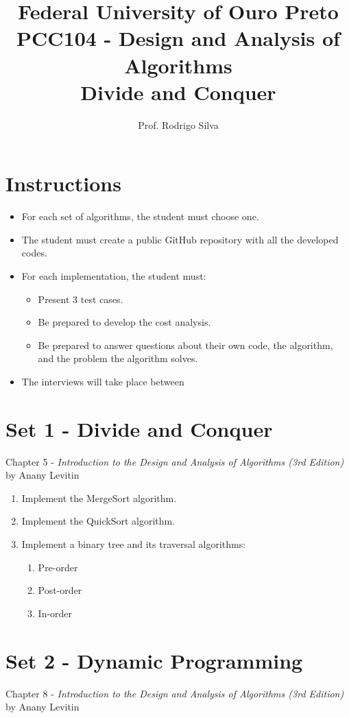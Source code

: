 \documentclass{article}
\title{\vspace{-2 cm}Federal University of Ouro Preto \\ PCC104 - Design and Analysis of Algorithms \\ Divide and Conquer}
\author{Prof. Rodrigo Silva}
\begin{document}
\maketitle

\section*{Instructions}

\begin{itemize}
    \item For each set of algorithms, the student must choose one.
    \item The student must create a public GitHub repository with all the developed codes.
    \item For each implementation, the student must:
    \begin{itemize}
        \item Present 3 test cases.
        \item Be prepared to develop the cost analysis.
        \item Be prepared to answer questions about their own code, the algorithm, and the problem the algorithm solves.
    \end{itemize}
    \item The interviews will take place between 
\end{itemize}

\section{Set 1 - Divide and Conquer}
Chapter 5 - \textit{Introduction to the Design and Analysis of Algorithms (3rd Edition)} by Anany Levitin

\begin{enumerate}
    \item Implement the MergeSort algorithm.
    \item Implement the QuickSort algorithm.
    \item Implement a binary tree and its traversal algorithms:
    \begin{enumerate}
        \item Pre-order
        \item Post-order
        \item In-order
    \end{enumerate}
\end{enumerate}

\section{Set 2 - Dynamic Programming}
Chapter 8 - \textit{Introduction to the Design and Analysis of Algorithms (3rd Edition)} by Anany Levitin
\end{document}
